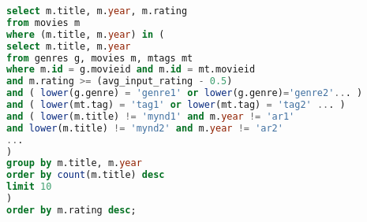 \documentclass[12pt, git, draft]{rureport}
\begin{document}
\begin{lstlisting}[language = SQL, caption = Finna líkar myndir, label = lst:simmovies]
select m.title, m.year, m.rating
from movies m
where (m.title, m.year) in (
select m.title, m.year
from genres g, movies m, mtags mt
where m.id = g.movieid and m.id = mt.movieid
and m.rating >= (avg_input_rating - 0.5)
and ( lower(g.genre) = 'genre1' or lower(g.genre)='genre2'... )
and ( lower(mt.tag) = 'tag1' or lower(mt.tag) = 'tag2' ... )
and ( lower(m.title) != 'mynd1' and m.year != 'ar1'
and lower(m.title) != 'mynd2' and m.year != 'ar2'
...
)
group by m.title, m.year
order by count(m.title) desc
limit 10
)
order by m.rating desc;
\end{lstlisting}


\clearpage
\printbibliography
\end{document}
